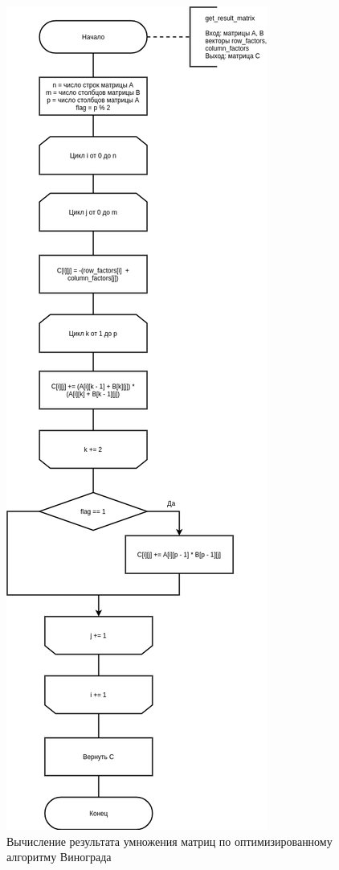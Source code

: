 \begin{figure}[H]
	\begin{center}
		\includegraphics[scale=0.4]{img/result_optimized.png}
	\end{center}
	\captionsetup{justification=centering}
	\caption{Вычисление результата умножения матриц по оптимизированному алгоритму Винограда}
	\label{img:result_optimized}
\end{figure}

